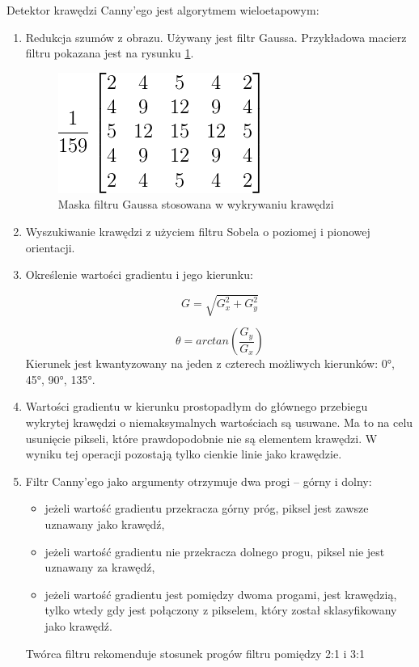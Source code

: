 Detektor krawędzi Canny'ego jest algorytmem wieloetapowym:
\begin{enumerate}
\item Redukcja szumów z obrazu. Używany jest filtr Gaussa. Przykładowa macierz filtru pokazana jest na rysunku \ref{fig:canny_gauss}. %
\begin{figure}[h]
\centering
\includegraphics[scale=0.8]{img/canny_gauss.png}
\caption{Maska filtru Gaussa stosowana w wykrywaniu krawędzi}
\label{fig:canny_gauss}
\end{figure}
\item Wyszukiwanie krawędzi z użyciem filtru Sobela o poziomej i pionowej orientacji.
\item Określenie wartości gradientu i jego kierunku:

\begin{equation}
G=\sqrt{G_x^2+G_y^2}
\end{equation}

\begin{equation}
\theta=arctan(\frac{G_y}{G_x})
\end{equation}
Kierunek jest kwantyzowany na jeden z czterech możliwych kierunków: \ang{0}, \ang{45}, \ang{90}, \ang{135}.

\item Wartości gradientu w kierunku prostopadłym do głównego przebiegu wykrytej krawędzi o niemaksymalnych wartościach są usuwane. %
Ma to na celu usunięcie pikseli, które prawdopodobnie nie są elementem krawędzi. 
W wyniku tej operacji pozostają tylko cienkie linie jako krawędzie.

\item Filtr Canny'ego jako argumenty otrzymuje dwa progi -- górny i dolny:
\begin{itemize}
\item jeżeli wartość gradientu przekracza górny próg, piksel jest zawsze uznawany jako krawędź,
\item jeżeli wartość gradientu nie przekracza dolnego progu, piksel nie jest uznawany za krawędź,
\item jeżeli wartość gradientu jest pomiędzy dwoma progami, jest krawędzią, tylko wtedy gdy jest połączony z pikselem, który został sklasyfikowany jako krawędź.
\end{itemize}
Twórca filtru rekomenduje stosunek progów filtru pomiędzy 2:1 i 3:1
\end{enumerate}
